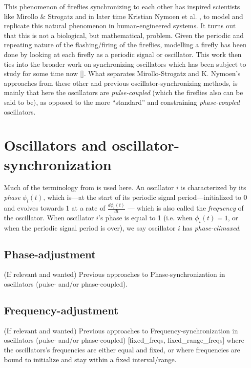 This phenomenon of fireflies synchronizing to each other has inspired scientists like Mirollo \& Strogatz \cite{mirollo_strogatz_PCO_synch} and in later time Kristian Nymoen et al. \cite{nymoen_synch}, to model and replicate this natural phenomenon in human-engineered systems. It turns out that this is not a biological, but mathematical, problem. Given the periodic and repeating nature of the flashing/firing of the fireflies, modelling a firefly has been done by looking at each firefly as a periodic signal or oscillator. This work \cite{mirollo_strogatz_PCO_synch, nymoen_synch} then ties into the broader work on synchronizing oscillators which has been subject to study for some time now []. What separates Mirollo-Strogatz and K. Nymoen's approaches from these other and previous oscillator-synchronizing methods, is mainly that here the oscillators are \textit{pulse-coupled} (which the fireflies also can be said to be), as opposed to the more ``standard'' and constraining \textit{phase-coupled} oscillators.




\section{Oscillators and oscillator-synchronization}

	
	
	Much of the terminology from \cite{nymoen_synch} is used here. An oscillator $i$ is characterized by its \textit{phase} $\phi_i(t)$, which is—at the start of its periodic signal period—initialized to 0 and evolves towards 1 at a rate of $\frac{d \phi_i(t)}{d t}$ — which is also called the \textit{frequency} of the oscillator. When oscillator $i$'s phase is equal to 1 (i.e. when $\phi_i(t)=1$, or when the periodic signal period is over), we say oscillator $i$ has \textit{phase-climaxed}.
	
	\subsection{Phase-adjustment}
				
	(If relevant and wanted) \nl
	Previous approaches to Phase-synchronization in oscillators (pulse- and/or phase-coupled).
		
	\subsection{Frequency-adjustment}
	
	(If relevant and wanted) \nl
	Previous approaches to Frequency-synchronization in oscillators (pulse- and/or phase-coupled) [fixed\_freqs, fixed\_range\_freqs] where the oscillators's frequencies are either equal and fixed, or where frequencies are bound to initialize and stay within a fixed interval/range.